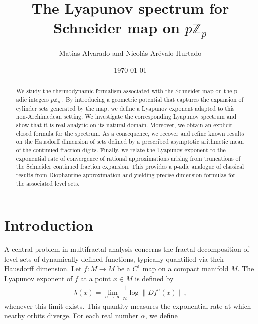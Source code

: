 \documentclass[11pt]{amsart}
\theoremstyle{remark}
\numberwithin{equation}{section}
\newcommand{\Z}{\mathbb{Z}}
\newcommand{\Zp}{\mathbb{Z}_p}
\begin{document}
\title{The Lyapunov spectrum for Schneider map on $p\Zp$}


\date{\today}




\author{ Matias Alvarado and Nicol\'as Ar\'evalo-Hurtado}	
\address{Instituto de Matem\'aticas, Universidad de Talca, Talca, Chile.}
\address{Universidad Escuela Colombiana de Ingenier\'ia Julio Garavito, Bogot\'a, Colombia.}



\begin{abstract}
We study the thermodynamic formalism associated with the Schneider map on the p-adic integers 
$p\Z_p$	. By introducing a geometric potential that captures the expansion of cylinder sets generated by the map, we define a Lyapunov exponent adapted to this non-Archimedean setting. We investigate the corresponding Lyapunov spectrum and show that it is real analytic on its natural domain. Moreover, we obtain an explicit closed formula for the spectrum. As a consequence, we recover and refine known results on the Hausdorff dimension of sets defined by a prescribed asymptotic arithmetic mean of the continued fraction digits. Finally, we relate the Lyapunov exponent to the exponential rate of convergence of rational approximations arising from truncations of the Schneider continued fraction expansion. This provides a 
p-adic analogue of classical results from Diophantine approximation and yielding precise dimension formulas for the associated level sets.

\end{abstract}

\maketitle

\section{Introduction}
A central problem in multifractal analysis concerns the fractal decomposition of level sets of dynamically defined functions, typically quantified via their Hausdorff dimension. Let $f:M\to M$ be a $C^{1}$ map on a compact manifold $M$. The Lyapunov exponent of $f$ at a point $x\in M$ is defined by 
\begin{align}\label{Lyapunov exponent definition}
    \lambda(x)=\lim_{n\rightarrow{\infty}}\dfrac{1}{n}\log \|Df^{n}(x)\|,
\end{align} whenever this limit exists. This quantity measures the exponential rate at which nearby orbits diverge.  For each real number $\alpha$, we define
\end{document}
